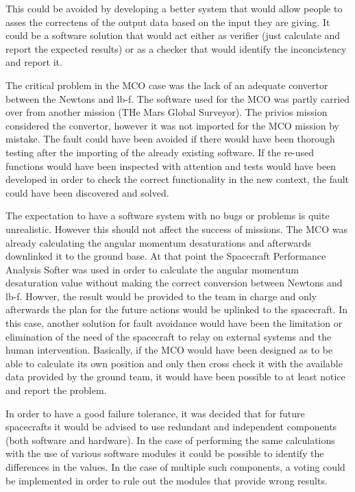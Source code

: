 This could be avoided by developing a better system that would allow people to
asses the correctens of the output data based on the input they are giving. It
could be a software solution that would act either as verifier (just calculate
and report the expected results) or as a checker that would identify the
inconcistency and report it.

The critical problem in the MCO case was the lack of an adequate convertor
between the Newtons and lb-f. The software used for the MCO was partly carried
over from another mission (THe Mars Global Surveyor). The privios mission
considered the convertor, however it was not imported for the MCO mission by
mistake. The fault could have been avoided if there would have been thorough
testing after the importing of the already existing software. If the re-used
functions would have been inspected with attention and tests would have been
developed in order to check the correct functionality in the new context, the
fault could have been discovered and solved.

The expectation to have a software system with no bugs or problems is quite
unrealistic. However this should not affect the success of missions. The MCO was
already calculating the angular momentum desaturations and afterwards downlinked
it to the ground base. At that point the Spacecraft Performance Analysis Softer
was used in order to calculate the angular momentum desaturation value without
making the correct conversion between Newtons and lb-f. Howver, the result would
be provided to the team in charge and only afterwards the plan for the future
actions would be uplinked to the spacecraft. In this case, another solution for
fault avoidance would have been the limitation or elimination of the need of the
spacecraft to relay on external systems and the human intervention. Basically,
if the MCO would have been designed as to be able to calculate its own position
and only then cross check it with the available data provided by the ground
team, it would have been possible to at least notice and report the problem.

In order to have a good failure tolerance, it was decided that for future
spacecrafts it would be advised to use redundant and independent components
(both software and hardware). In the case of performing the same calculations
with the use of various software modules it could be possible to identify the
differences in the values. In the case of multiple such components, a voting
could be implemented in order to rule out the modules that provide wrong
results.

